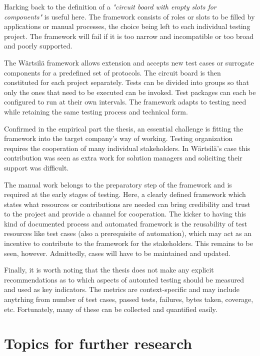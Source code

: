 \documentclass[12pt,a4paper,oneside,pdftex]{report}
\begin{document}
{Harking back to the \citep{pezze2008software} definition of a \emph{"circuit board with empty slots for components"} is useful here. The framework consists of roles or slots to be filled by applications or manual processes, the choice being left to each individual testing project. The framework will fail if it is too narrow and incompatible or too broad and poorly supported.

The Wärtsilä framework allows extension and accepts new test cases or surrogate components for a predefined set of protocols. The circuit board is then constituted for each project separately. Tests can be divided into groups so that only the ones that need to be executed can be invoked. Test packages can each be configured to run at their own intervals. The framework adapts to testing need while retaining the same testing process and technical form.

Confirmed in the empirical part the thesis, an essential challenge is fitting the framework into the target company's way of working. Testing organization requires the cooperation of many individual stakeholders. In Wärtsilä's case this contribution was seen as extra work for solution managers and soliciting their support was difficult. 

The manual work belongs to the preparatory step of the framework and is required at the early stages of testing. Here, a clearly defined framework which states what resources or contributions are needed can bring credibility and trust to the project and provide a channel for cooperation. The kicker to having this kind of documented process and automated framework is the reusability of test resources like test cases (also a prerequisite of automation), which may act as an incentive to contribute to the framework for the stakeholders. This remains to be seen, however. Admittedly, cases will have to be maintained and updated.

Finally, it is worth noting that the thesis does not make any explicit recommendations as to which aspects of automted testing should be measured and used as key indicators. The metrics are context-specific and may include anytrhing from number of test cases, passed tests, failures, bytes taken, coverage, etc. Fortunately, many of these can be collected and quantified easily.


\section{Topics for further research}

}
\end{document}
